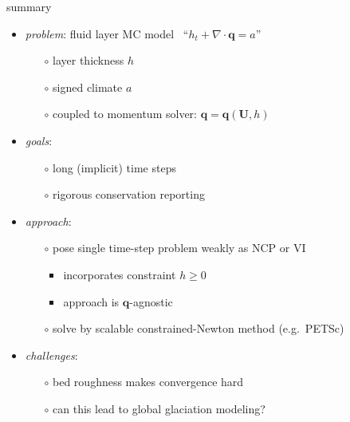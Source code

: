 \documentclass[xcolor={dvipsnames}]{beamer}
\newcommand\bq{\mathbf{q}}
\newcommand\bU{\mathbf{U}}
\newcommand\Div{\nabla\cdot}
\begin{document}
\begin{frame}{summary}

  \begin{itemize}
  \item \emph{problem}: fluid layer MC model \, ``$h_t + \Div\bq = a$''
    \begin{itemize}
    \item[$\circ$]  layer thickness $h$
    \item[$\circ$]  signed climate $a$
    \item[$\circ$]  coupled to momentum solver: $\bq=\bq(\bU,h)$
    \end{itemize}
  \item \emph{goals}:
    \begin{itemize}
    \item[$\circ$]  long (implicit) time steps
    \item[$\circ$]  rigorous conservation reporting
    \end{itemize}
  \item \emph{approach}:
    \begin{itemize}
    \item[$\circ$]  pose single time-step problem weakly as NCP or VI
      \begin{itemize}
      \item  incorporates constraint $h\ge 0$
      \item  approach is $\bq$-agnostic
      \end{itemize}
    \item[$\circ$]  solve by scalable constrained-Newton method (e.g.~PETSc)
    \end{itemize}
  \item \emph{challenges}:
    \begin{itemize}
    \item[$\circ$]  bed roughness makes convergence hard
    \item[$\circ$]  can this lead to global glaciation modeling?
    \end{itemize}
  \end{itemize}
\end{frame}
\end{document}
